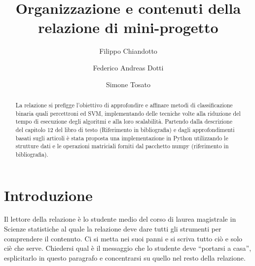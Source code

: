 \documentclass[runningheads]{llncs}
\begin{document}
%
\title{Organizzazione e contenuti della relazione di mini-progetto}
%
%
\author{%
  Filippo Chiandotto \and
  Federico Andreas Dotti \and
  Simone Tosato}
%
%
%
\maketitle        
%
\begin{abstract}
  La relazione si prefigge l’obiettivo di approfondire e affinare metodi di classificazione binaria quali percettroni ed SVM, implementando delle tecniche volte alla riduzione del tempo di esecuzione degli algoritmi e alla loro scalabilità. 
Partendo dalla descrizione del capitolo 12 del libro di testo (Riferimento in bibliografia) e dagli approfondimenti basati sugli articoli è stata proposta una implementazione in Python utilizzando le strutture dati e le operazioni matriciali forniti dal pacchetto numpy (riferimento in bibliografia).   


\end{abstract}

\section{Introduzione}
\label{sec:introduzione}

Il lettore della relazione \`e lo studente medio del corso di laurea
magistrale in Scienze statistiche al quale la relazione deve dare
tutti gli strumenti per comprendere il contenuto.  Ci si metta nei
suoi panni e si scriva tutto ci\`o e solo ci\`e che serve.  Chiedersi
qual \`e il messaggio che lo studente deve ``portarsi a casa'',
esplicitarlo in questo paragrafo e concentrarsi su quello nel resto
della relazione.
\end{document}
